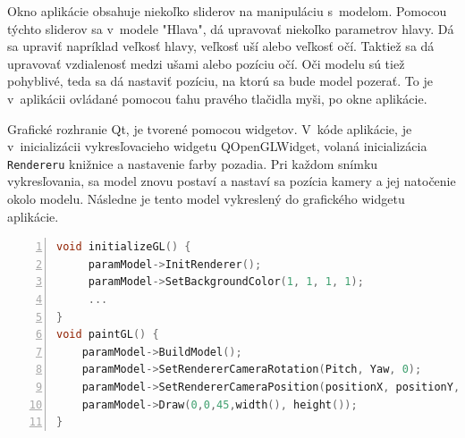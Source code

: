 Okno aplikácie obsahuje niekoľko sliderov na manipuláciu s~modelom. Pomocou týchto sliderov sa v~modele "Hlava", dá upravovať niekoľko parametrov hlavy. Dá sa upraviť napríklad veľkosť hlavy, veľkosť uší alebo veľkosť očí. Taktiež sa dá upravovať vzdialenosť medzi ušami alebo pozíciu očí. Oči modelu sú tiež pohyblivé, teda sa dá nastaviť pozíciu, na ktorú sa bude model pozerať. To je v~aplikácii ovládané pomocou ťahu pravého tlačidla myši, po okne aplikácie.  

Grafické rozhranie Qt, je tvorené pomocou widgetov. V~kóde aplikácie, je v~inicializácii vykresľovacieho widgetu QOpenGLWidget, volaná inicializácia \texttt{Rendereru} knižnice a nastavenie farby pozadia. 
Pri každom snímku vykresľovania, sa model znovu postaví a nastaví sa pozícia kamery a jej natočenie okolo modelu. Následne je tento model vykreslený do grafického widgetu aplikácie.

\begin{minipage}{\linewidth}
\begin{lstlisting}[language=C,frame=tb,numbers=left,emph={void,int,char,double,float,unsigned},emphstyle={\color{blue}},tabsize=2]
void initializeGL() {
	 paramModel->InitRenderer();
	 paramModel->SetBackgroundColor(1, 1, 1, 1);
	 ...
}
void paintGL() {
	paramModel->BuildModel();
	paramModel->SetRendererCameraRotation(Pitch, Yaw, 0);
	paramModel->SetRendererCameraPosition(positionX, positionY, distance);
	paramModel->Draw(0,0,45,width(), height());
}
\end{lstlisting}
\end{minipage}

